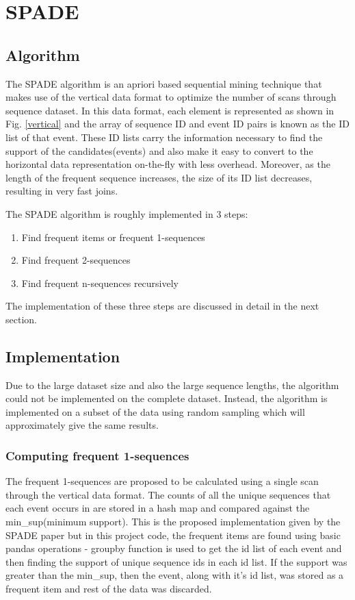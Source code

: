 \section{SPADE}

\subsection{Algorithm}
The SPADE algorithm is an apriori based sequential mining technique that makes use of the vertical data format to optimize the number of scans through sequence dataset. In this data format, each element is represented as shown in Fig. \ref{vertical} and the array of sequence ID and event ID pairs is known as the ID list of that event. These ID lists carry the information necessary to find the support of the candidates(events) and also make it easy to convert to the horizontal data representation on-the-fly with less overhead. Moreover, as the length of the frequent sequence increases, the size of its ID list decreases, resulting in very fast joins.

The SPADE algorithm is roughly implemented in 3 steps:
\begin{enumerate}
    \item Find frequent items or frequent 1-sequences
    \item Find frequent 2-sequences
    \item Find frequent n-sequences recursively
\end{enumerate}

The implementation of these three steps are discussed in detail in the next section.

\subsection{Implementation}

Due to the large dataset size and also the large sequence lengths, the algorithm could not be implemented on the complete dataset. Instead, the algorithm is implemented on a subset of the data using random sampling which will approximately give the same results.

\subsubsection{Computing frequent 1-sequences}

The frequent 1-sequences are proposed to be calculated using a single scan through the vertical data format. The counts of all the unique sequences that each event occurs in are stored in a hash map and compared against the min\_sup(minimum support). This is the proposed implementation given by the SPADE paper \cite{b1} but in this project code, the frequent items are found using basic pandas operations - groupby function is used to get the id list of each event and then finding the support of unique sequence ids in each id list. If the support was greater than the min\_sup, then the event, along with it's id list, was stored as a frequent item and rest of the data was discarded.

